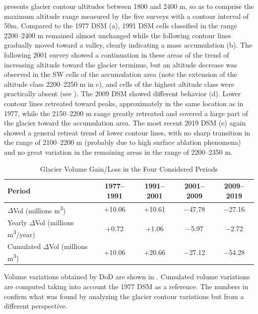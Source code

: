 {{ presents glacier contour altitudes between 1800 and 2400 m, so as to comprise the maximum altitude range measured by the five surveys with a contour interval of 50m.
Compared to the 1977 DSM (a), 1991 DSM cells classified in the range 2200–2400 m remained almost unchanged while the following contour lines gradually moved toward a valley, clearly indicating a mass accumulation (b).
The following 2001 survey showed a continuation in these areas of the trend of increasing altitude toward the glacier terminus, but an altitude decrease was observed in the SW cells of the accumulation area (note the extension of the altitude class 2200–2250 m in c), and cells of the highest altitude class were practically absent (see ). 
The 2009 DSM showed different behavior (d). 
Lower contour lines retreated toward peaks, approximately in the same location as in 1977, while the 2150–2200 m range greatly retreated and covered a large part of the glacier toward the accumulation area.
The most recent 2019 DSM (e) again showed a general retreat trend of lower contour lines, with no sharp transition in the range of 2100–2200 m (probably due to high surface ablation phenomena) and no great variation in the remaining areas in the range of 2200–2350 m.

\begin{table}[ht]
  \centering
  \caption{Glacier Volume Gain/Loss in the Four Considered Periods}
  \label{tab:2:glacier_volume_variations}
  \begin{tabular}{lcccc}
    \hline
    Period & 1977--1991 & 1991--2001 & 2001--2009 & 2009--2019 \\
    \hline
    $\Delta$Vol (millions m\textsuperscript{3}) & +10.06 & +10.61 & $-$47.78 & $-$27.16 \\
    Yearly $\Delta$Vol (millions m\textsuperscript{3}/year) & +0.72 & +1.06 & $-$5.97 & $-$2.72 \\
    Cumulated $\Delta$Vol (millions m\textsuperscript{3}) & +10.06 & +20.66 & $-$27.12 & $-$54.28 \\
    \hline
  \end{tabular}
\end{table}

Volume variations obtained by DoD are shown in .
Cumulated volume variations are computed taking into account the 1977 DSM as a reference.
The numbers in  confirm what was found by analyzing the glacier contour variations but from a different perspective. 

}}
